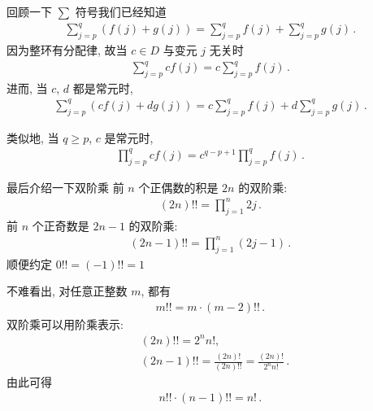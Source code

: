 \begin{remark}
    回顾一下 $\sum$ 符号\period 我们已经知道
    \begin{align*}
        \sum_{j=p}^{q} (f(j) + g(j)) = \sum_{j=p}^{q} f(j) + \sum_{j=p}^{q} g(j) \period
    \end{align*}
    因为整环有分配律, 故当 $c \in D$ 与变元 $j$ 无关时
    \begin{align*}
        \sum_{j=p}^{q} cf(j) = c\sum_{j=p}^{q} f(j) \period
    \end{align*}
    进而, 当 $c$, $d$ 都是常元时,
    \begin{align*}
        \sum_{j=p}^{q} (cf(j) + dg(j)) = c\sum_{j=p}^{q} f(j) + d\sum_{j=p}^{q} g(j) \period
    \end{align*}

    类似地, 当 $q \geq p$, $c$ 是常元时,
    \begin{align*}
        \prod_{j=p}^{q} cf(j) = c^{q-p+1} \prod_{j=p}^{q} f(j) \period
    \end{align*}
\end{remark}

\begin{definition}
    最后介绍一下双阶乘 \period 前 $n$ 个正偶数的积是 $2n$ 的双阶乘:
    \begin{align*}
        (2n)!! = \prod_{j=1}^{n} {2j} \period
    \end{align*}
    前 $n$ 个正奇数是 $2n-1$ 的双阶乘:
    \begin{align*}
        (2n-1)!! = \prod_{j=1}^{n} {(2j-1)} \period
    \end{align*}
    顺便约定 $0!! = (-1)!! = 1$\period
\end{definition}

\begin{remark}
    不难看出, 对任意正整数 $m$, 都有
    \begin{align*}
        m!! = m \cdot (m-2)!! \period
    \end{align*}
    双阶乘可以用阶乘表示:
    \begin{align*}
         & (2n)!! = 2^n n!,                                               \\
         & (2n-1)!! = \frac{(2n)!}{(2n)!!} = \frac{(2n)!}{2^n n!} \period
    \end{align*}
    由此可得
    \begin{align*}
        n!! \cdot (n-1)!! = n! \period
    \end{align*}
\end{remark}

